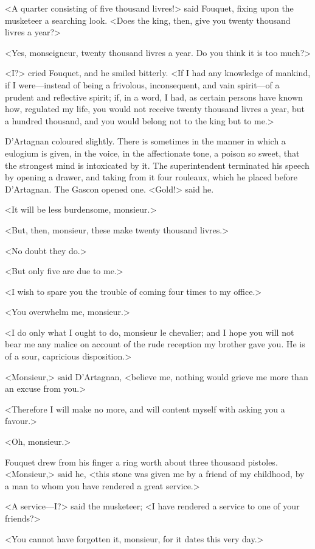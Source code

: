 <A quarter consisting of five thousand livres!> said Fouquet, fixing upon the musketeer a searching look. <Does the king, then, give you twenty thousand livres a year?>

<Yes, monseigneur, twenty thousand livres a year. Do you think it is too much?>

<I\@?> cried Fouquet, and he smiled bitterly. <If I had any knowledge of mankind, if I were—instead of being a frivolous, inconsequent, and vain spirit—of a prudent and reflective spirit; if, in a word, I had, as certain persons have known how, regulated my life, you would not receive twenty thousand livres a year, but a hundred thousand, and you would belong not to the king but to me.>

D'Artagnan coloured slightly. There is sometimes in the manner in which a eulogium is given, in the voice, in the affectionate tone, a poison so sweet, that the strongest mind is intoxicated by it. The superintendent terminated his speech by opening a drawer, and taking from it four rouleaux, which he placed before D'Artagnan. The Gascon opened one. <Gold!> said he.

<It will be less burdensome, monsieur.>

<But, then, monsieur, these make twenty thousand livres.>

<No doubt they do.>

<But only five are due to me.>

<I wish to spare you the trouble of coming four times to my office.>

<You overwhelm me, monsieur.>

<I do only what I ought to do, monsieur le chevalier; and I hope you will not bear me any malice on account of the rude reception my brother gave you. He is of a sour, capricious disposition.>

<Monsieur,> said D'Artagnan, <believe me, nothing would grieve me more than an excuse from you.>

<Therefore I will make no more, and will content myself with asking you a favour.>

<Oh, monsieur.>

Fouquet drew from his finger a ring worth about three thousand pistoles. <Monsieur,> said he, <this stone was given me by a friend of my childhood, by a man to whom you have rendered a great service.>

<A service—I\@?> said the musketeer; <I have rendered a service to one of your friends?>

<You cannot have forgotten it, monsieur, for it dates this very day.>

